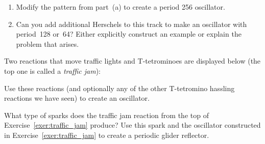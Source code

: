 \begin{multicols}{2}
\begin{problem}
\begin{enumerate}[label=\bf\color{ocre}(\alph*)]
			\item Modify the pattern from part~(a) to create a period 256 oscillator. %
			
			\item Can you add additional Herschels to this track to make an oscillator with period~128 or~64? Either explicitly construct an example or explain the problem that arises. %
		\end{enumerate}
	\end{problem}
	
	\mfilbreak
	
	\begin{problemstar}\label{exer:traffic_jam}
		Two reactions that move traffic lights and T-tetrominoes are displayed below (the top one is called a \emph{traffic jam}):
		
		\noindent\begin{center}
		\end{center}\vspace*{-0.35cm}
		
		\noindent\begin{center}
		\end{center}
		
		\noindent Use these reactions (and optionally any of the other T-tetromino hassling reactions we have seen) to create an oscillator.
	\end{problemstar}
	
	
	\mfilbreak
	
	
	\begin{problemstar}\label{exer:traffic_jam_reflect}
		What type of sparks does the traffic jam reaction from the top of Exercise~\ref{exer:traffic_jam} produce? Use this spark and the oscillator constructed in Exercise~\ref{exer:traffic_jam} to create a periodic glider reflector.
	\end{problemstar}
	

\end{multicols}
